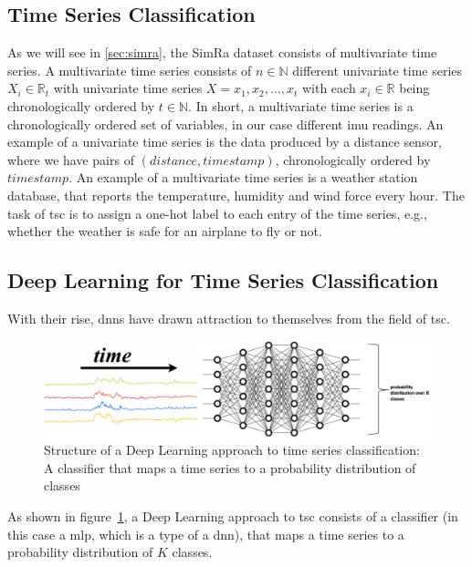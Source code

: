 \subsection{Time Series Classification}
As we will see in \cref{sec:simra}, the SimRa dataset consists of multivariate time series.
A multivariate time series consists of $n \in \mathbb{N}$ different univariate time series $X_{i} \in \mathbb{R}_{t}$ with univariate time series $X = x_{1}, x_{2},...,x_{t}$ with each $x_{i} \in \mathbb{R}$ being chronologically ordered by $t \in \mathbb{N}$.
In short, a multivariate time series is a chronologically ordered set of variables, in our case different \ac{imu} readings.
An example of a univariate time series is the data produced by a distance sensor, where we have pairs of $(distance,timestamp)$, chronologically ordered by $timestamp$.
An example of a multivariate time series is a weather station database, that reports the temperature, humidity and wind force every hour.
The task of \ac{tsc} is to assign a one-hot label to each entry of the time series, e.g., whether the weather is safe for an airplane to fly or not. 

\subsection{Deep Learning for Time Series Classification}
With their rise, \acp{dnn} have drawn attraction to themselves from the field of \ac{tsc}.

\begin{figure}
    \center
    \includegraphics[width=\columnwidth]{fig/deep_learning_structure.pdf}
    \caption{Structure of a Deep Learning approach to time series classification: A classifier that maps a time series to a probability distribution of classes\cite{chen2021deep}}
    \label{fig:deep_learning_structure}
\end{figure}

As shown in figure~\ref{fig:deep_learning_structure}, a Deep Learning approach to \ac{tsc} consists of a classifier (in this case a \ac{mlp}, which is a type of a \ac{dnn}), that maps a time series to a probability distribution of $K$ classes.

